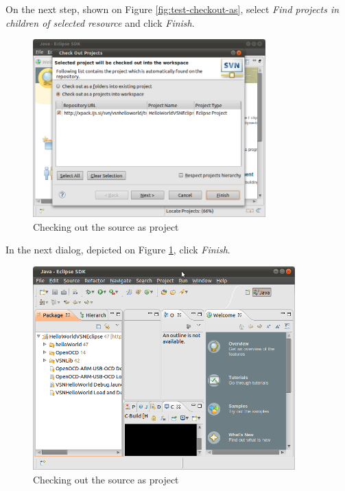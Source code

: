 \documentclass[a4paper, 10pt]{article}
\begin{document}
On the next step, shown on Figure \ref{fig:test-checkout-as}, select
\emph{Find projects in children of selected resource} and click \emph{Finish}.

    \begin{figure}[H]
    \centering
        \includegraphics[width=0.8\textwidth]{./install-guide-linux-images/test-project-select.png}
        \caption{Checking out the source as project}
        \label{fig:test-project-select}
    \end{figure}

In the next dialog, depicted on
Figure \ref{fig:test-project-select},
click \emph{Finish}.

    \begin{figure}[H]
    \centering
        \includegraphics[width=0.9\textwidth]{./install-guide-linux-images/test-got-project.png}
        \caption{Checking out the source as project}
        \label{fig:test-got-project}
    \end{figure}
\end{document}
